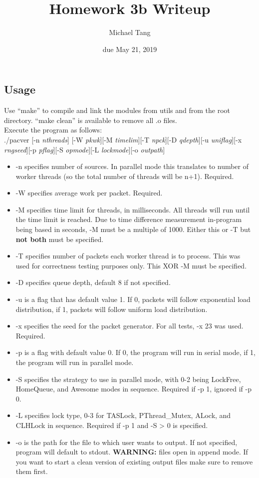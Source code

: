 \documentclass{article}
\title{Homework 3b Writeup}
\author{Michael Tang}
\date{due May 21, 2019}
\begin{document}
\maketitle
\begin{adjustwidth}{-2cm}{-2cm}
\section{Usage}
Use ``make'' to compile and link the modules from utils and from the root directory. ``make clean'' is available to remove all .o files.\\
Execute the program as follows:\\
./pacver [-n \textit{nthreads}] [-W \textit{pkwk}][-M \textit{timelim}][-T \textit{npck}][-D \textit{qdepth}][-u \textit{uniflag}][-x \textit{rngseed}][-p \textit{pflag}][-S \textit{opmode}][-L \textit{lockmode}][-o \textit{outpath}]
\begin{itemize}
	\item -n specifies number of sources. In parallel mode this translates to number of worker threads (so the total number of threads will be n+1). Required.
	\item -W specifies average work per packet. Required.
	\item -M specifies time limit for threads, in milliseconds. All threads will run until the time limit is reached. Due to time difference measurement in-program being based in seconds, -M must be a multiple of 1000. Either this or -T but \textbf{not both} must be specified.
	\item -T specifies number of packets each worker thread is to process. This was used for correctness testing purposes only. This XOR -M must be specified.
	\item -D specifies queue depth, default 8 if not specified.
	\item -u is a flag that has default value 1. If 0, packets will follow exponential load distribution, if 1, packets will follow uniform load distribution.
	\item -x specifies the seed for the packet generator. For all tests, -x 23 was used. Required.
	\item -p is a flag with default value 0. If 0, the program will run in serial mode, if 1, the program will run in parallel mode.
	\item -S specifies the strategy to use in parallel mode, with 0-2 being LockFree, HomeQueue, and Awesome modes in sequence. Required if -p 1, ignored if -p 0.
	\item -L specifies lock type, 0-3 for TASLock, PThread\_Mutex, ALock, and CLHLock in sequence. Required if -p 1 and -S > 0 is specified.
	\item -o is the path for the file to which user wants to output. If not specified, program will default to stdout. \textbf{WARNING:} files open in append mode. If you want to start a clean version of existing output files make sure to remove them first.
\end{itemize} 


\end{adjustwidth}
\end{document}

